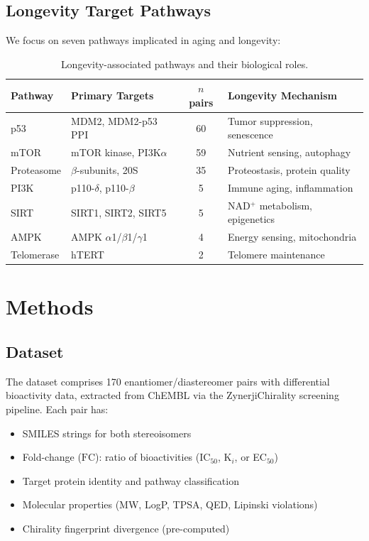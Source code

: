 \documentclass[11pt,a4paper]{article}
\newcommand{\FC}{\text{FC}}
\begin{document}
\subsection{Longevity Target Pathways}

We focus on seven pathways implicated in aging and longevity:

\begin{table}[H]
\centering
\caption{Longevity-associated pathways and their biological roles.}
\label{tab:pathways}
\begin{tabular}{@{}llcl@{}}
\toprule
\textbf{Pathway} & \textbf{Primary Targets} & \textbf{$n$ pairs} & \textbf{Longevity Mechanism} \\
\midrule
p53     & MDM2, MDM2-p53 PPI      & 60 & Tumor suppression, senescence \\
mTOR    & mTOR kinase, PI3K$\alpha$     & 59 & Nutrient sensing, autophagy \\
Proteasome & $\beta$-subunits, 20S  & 35 & Proteostasis, protein quality \\
PI3K    & p110-$\delta$, p110-$\beta$  & 5  & Immune aging, inflammation \\
SIRT    & SIRT1, SIRT2, SIRT5     & 5  & NAD$^+$ metabolism, epigenetics \\
AMPK    & AMPK $\alpha$1/$\beta$1/$\gamma$1 & 4  & Energy sensing, mitochondria \\
Telomerase & hTERT                 & 2  & Telomere maintenance \\
\bottomrule
\end{tabular}
\end{table}

\section{Methods}

\subsection{Dataset}

The dataset comprises 170 enantiomer/diastereomer pairs with differential
bioactivity data, extracted from ChEMBL via the ZynerjiChirality screening
pipeline. Each pair has:
\begin{itemize}[nosep]
    \item SMILES strings for both stereoisomers
    \item Fold-change ($\FC$): ratio of bioactivities (IC$_{50}$, K$_i$, or EC$_{50}$)
    \item Target protein identity and pathway classification
    \item Molecular properties (MW, LogP, TPSA, QED, Lipinski violations)
    \item Chirality fingerprint divergence (pre-computed)
\end{itemize}
\end{document}
